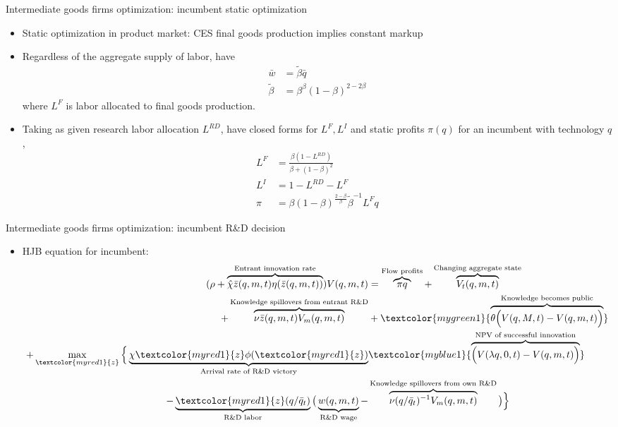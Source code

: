\documentclass[english,usenames,dvipsnames]{beamer}
\begin{document}
\begin{frame}{Intermediate goods firms optimization: incumbent static optimization}
\begin{itemize}
	\footnotesize
	\item Static optimization in product market: CES final goods production implies constant markup
	\item Regardless of the aggregate supply of labor, have
	\begin{align*}
		\bar{w} &= \tilde{\beta} \bar{q}  \\
		\tilde{\beta} &= \beta^{\beta} (1-\beta)^{2-2\beta} 
	\end{align*}
	where $L^F$ is labor allocated to final goods production. 
	\item Taking as given research labor allocation $L^{RD}$, have closed forms for $L^F,L^I$ and static profits $\pi(q)$ for an incumbent with technology $q$,
	\begin{align*}
	L^F &= \frac{\beta(1-L^{RD})}{\beta + (1-\beta)^2} \\
	L^I &= 1 - L^{RD} - L^F \\
	\pi &= \beta(1-\beta)^{\frac{2-\beta}{\beta}} \tilde{\beta}^{-1} L^F q
	\end{align*}
\end{itemize}
\end{frame}

\begin{frame}{Intermediate goods firms optimization: incumbent R\&D decision}
\begin{itemize}
	\item HJB equation for incumbent:
	\footnotesize
	\begin{align*}
	(\rho + \overbrace{\hat{\chi} \bar{z}(q,m,t)\eta(\bar{z}(q,m,t))}^{\text{Entrant innovation rate}}) V(q,m,t) &= \overbrace{\pi q}^{\text{Flow profits}} + \overbrace{V_t(q,m,t)}^{\text{Changing aggregate state}} \\ 
	 +  \overbrace{\nu \bar{z}(q,m,t) V_m(q,m,t)}^{\text{Knowledge spillovers from entrant R\&D}} & + \textcolor{mygreen1}{\overbrace{\theta \Big(V(q,M,t) - V(q,m,t)\Big)}^{\text{Knowledge becomes public}}}\\
	 + \max_{\textcolor{myred1}{z}} \Big\{\underbrace{\chi \textcolor{myred1}{z}\phi(\textcolor{myred1}{z})}_{\text{Arrival rate of R\&D victory}} &\textcolor{myblue1}{\overbrace{\Big(V(\lambda q,0,t)-V(q,m,t)\Big)}^{\text{NPV of successful innovation}}} \\
	 -\underbrace{\textcolor{myred1}{z}(q/\bar{q}_t)}_{\text{R\&D labor}} \big(\underbrace{w(q,m,t)}_{\text{R\&D wage}} - & \overbrace{\nu (q/\bar{q}_t)^{-1} V_m(q,m,t)}^{\text{Knowledge spillovers from own R\&D}}\big)\Big \}
	\end{align*}
\end{itemize}
\end{frame}
\end{document}
